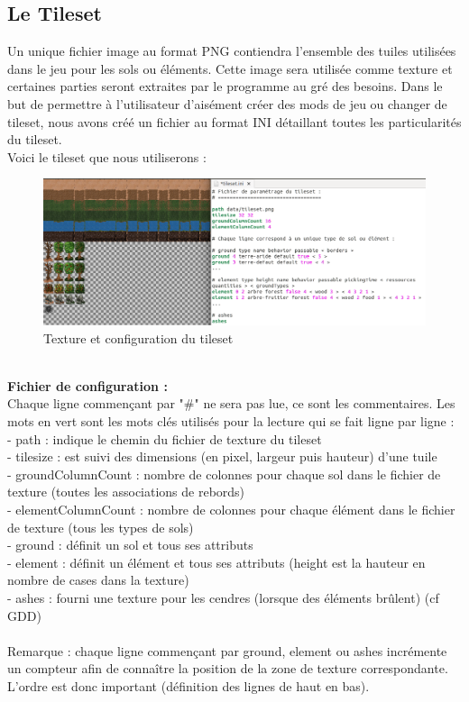 \documentclass[a4paper]{article}
\newcommand{\alinea}{\hspace*{0.5cm}}
\begin{document}
      \subsection{Le Tileset}
		\label{TilesetDev}
		\alinea Un unique fichier image au format PNG contiendra l'ensemble des tuiles utilisées dans le jeu pour les sols ou éléments. Cette image sera utilisée comme texture et certaines parties seront extraites par le programme au gré des besoins.
		\alinea Dans le but de permettre à l'utilisateur d'aisément créer des mods de jeu ou changer de tileset, nous avons créé un fichier au format INI détaillant toutes les particularités du tileset.\\
		\alinea Voici le tileset que nous utiliserons :\\
        \begin{figure}
          \begin{center}
            \includegraphics[scale=0.35]{img/TilesetPngIni.png}
          \end{center}
          \label{TilesetPngIni}
          \caption{Texture et configuration du tileset}
        \end{figure}
        \\
        \textbf{Fichier de configuration :}\\
        \alinea Chaque ligne commençant par "\#" ne sera pas lue, ce sont les commentaires. Les mots en vert sont les mots clés utilisés pour la lecture qui se fait ligne par ligne :\\
        - path : indique le chemin du fichier de texture du tileset\\
        - tilesize : est suivi des dimensions (en pixel, largeur puis hauteur) d'une tuile\\
        - groundColumnCount : nombre de colonnes pour chaque sol dans le fichier de texture (toutes les associations de rebords)\\
        - elementColumnCount : nombre de colonnes pour chaque élément dans le fichier de texture (tous les types de sols)\\
        - ground : définit un sol et tous ses attributs\\
        - element : définit un élément et tous ses attributs (height est la hauteur en nombre de cases dans la texture)\\
        - ashes : fourni une texture pour les cendres (lorsque des éléments brûlent) (cf GDD)\\
        \\
        Remarque : chaque ligne commençant par ground, element ou ashes incrémente un compteur afin de connaître la position de la zone de texture correspondante. L'ordre est donc important (définition des lignes de haut en bas).
        
\end{document}

